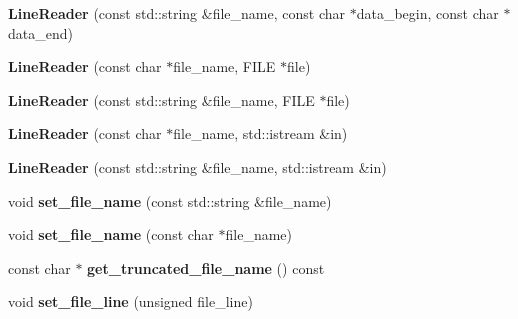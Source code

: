 \begin{DoxyCompactItemize}
\item 
\mbox{\label{classio_1_1_line_reader_a0a52d864b46442a253443cac1367366e}} 
{\bfseries Line\+Reader} (const std\+::string \&file\+\_\+name, const char $\ast$data\+\_\+begin, const char $\ast$data\+\_\+end)
\item 
\mbox{\label{classio_1_1_line_reader_ad2a8943ba0848ae5052e2f5ad30c010e}} 
{\bfseries Line\+Reader} (const char $\ast$file\+\_\+name, F\+I\+LE $\ast$file)
\item 
\mbox{\label{classio_1_1_line_reader_a93fa2e3ae98b0e7a7391714d6395c552}} 
{\bfseries Line\+Reader} (const std\+::string \&file\+\_\+name, F\+I\+LE $\ast$file)
\item 
\mbox{\label{classio_1_1_line_reader_a301c08eb9ca5d3fdccf4e9a8e5ac82f8}} 
{\bfseries Line\+Reader} (const char $\ast$file\+\_\+name, std\+::istream \&in)
\item 
\mbox{\label{classio_1_1_line_reader_a3eacf4d1539a24122c6897fce4e72f06}} 
{\bfseries Line\+Reader} (const std\+::string \&file\+\_\+name, std\+::istream \&in)
\item 
\mbox{\label{classio_1_1_line_reader_a1a0763d491dec16cebc33134e965dfee}} 
void {\bfseries set\+\_\+file\+\_\+name} (const std\+::string \&file\+\_\+name)
\item 
\mbox{\label{classio_1_1_line_reader_a81c56ac68497da5ec874333ce063fd83}} 
void {\bfseries set\+\_\+file\+\_\+name} (const char $\ast$file\+\_\+name)
\item 
\mbox{\label{classio_1_1_line_reader_ad5817da6af1ae77daddec7aeaeebf2f8}} 
const char $\ast$ {\bfseries get\+\_\+truncated\+\_\+file\+\_\+name} () const
\item 
\mbox{\label{classio_1_1_line_reader_a581b55d4ced6adb964de50fa8ac6eb08}} 
void {\bfseries set\+\_\+file\+\_\+line} (unsigned file\+\_\+line)
\item 
\mbox{\label{classio_1_1_line_reader_a3f3459e22ed8e459238c290050b6722e}} 

\end{DoxyCompactItemize}
